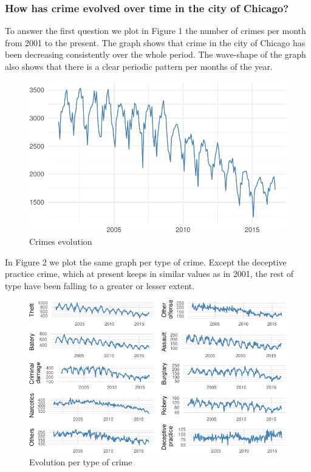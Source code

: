 \documentclass[]{article}
\begin{document}
\subsubsection{How has crime evolved over time in the city of
Chicago?}\label{how-has-crime-evolved-over-time-in-the-city-of-chicago}

To answer the first question we plot in Figure 1 the number of crimes
per month from 2001 to the present. The graph shows that crime in the
city of Chicago has been decreasing consistently over the whole period.
The wave-shape of the graph also shows that there is a clear periodic
pattern per months of the year.

\begin{figure}[htbp]
\centering
\includegraphics{Assessment_1v12_files/figure-latex/fig-1.pdf}
\caption{Crimes evolution}
\end{figure}

In Figure 2 we plot the same graph per type of crime. Except the
deceptive practice crime, which at present keeps in similar values as in
2001, the rest of type have been falling to a greater or lesser extent.

\begin{figure}[H]

{\centering \includegraphics{Assessment_1v12_files/figure-latex/fig2-1} 

}

\caption{Evolution per type of crime}\label{fig:fig2}
\end{figure}
\end{document}
